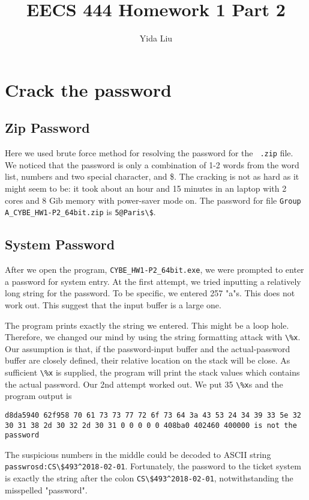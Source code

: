 \documentclass[11pt]{article}
\begin{document}
\author{Yida Liu}
\title{EECS 444 Homework 1 Part 2}
\maketitle

\section{Crack the password}

\subsection{Zip Password}

Here we used brute force method for resolving the password for the \lstinline{ .zip} file. We noticed that the password is only a combination of 1-2 words from the word list, numbers and two special character, \@ and \$. The cracking is not as hard as it might seem to be: it took about an hour and 15 minutes in an laptop with 2 cores and 8 Gib memory with power-saver mode on. The password for file \lstinline{Group A_CYBE_HW1-P2_64bit.zip} is \lstinline{5@Paris\$}.

\subsection{System Password}

After we open the program, \lstinline{CYBE_HW1-P2_64bit.exe}, we were prompted to enter a password for system entry. At the first attempt, we tried inputting a relatively long string for the password. To be specific, we entered 257 "a"s. This does not work out. This suggest that the input buffer is a large one. 

The program prints exactly the string we entered. This might be a loop hole. Therefore, we changed our mind by using the string formatting attack with \lstinline{\%x}. Our assumption is that, if the password-input buffer and the actual-password buffer are closely defined, their relative location on the stack will be close. As sufficient \lstinline{\%x} is supplied, the program will print the stack values which contains the actual password. Our 2nd attempt worked out. We put 35 \lstinline{\%x}s and the program output is
\begin{lstlisting}
d8da5940 62f958 70 61 73 73 77 72 6f 73 64 3a 43 53 24 34 39 33 5e 32 30 31 38 2d 30 32 2d 30 31 0 0 0 0 0 408ba0 402460 400000 is not the password
\end{lstlisting}
The suspicious numbers in the middle could be decoded to ASCII string \lstinline{passwrosd:CS\$493^2018-02-01}. Fortunately, the password to the ticket system is exactly the string after the colon \lstinline{CS\$493^2018-02-01}, notwithstanding the misspelled "password". 
\end{document}
